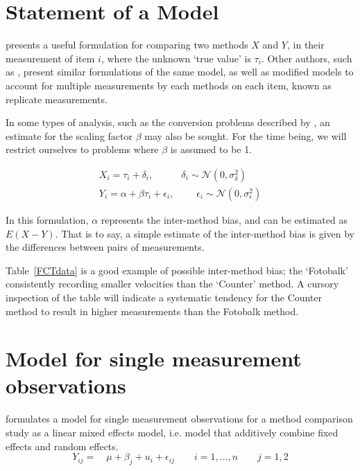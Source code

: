 \documentclass[12pt, a4paper]{report}
\theoremstyle{plain}
\theoremstyle{definition}
\theoremstyle{remark}
\begin{document}
	

	\section{Statement of a Model}
	\citet{BXC2010} presents a useful formulation for comparing two methods $X$ and $Y$, in their measurement of item $i$, where the unknown `true value' is $\tau_i$. Other authors, such as \citet{kinsella}, present similar formulations of the same model, as well as modified models to account for multiple measurements by each methods on each item, known as replicate measurements.
	
	In some types of analysis, such as the conversion problems described by \citet{lewis}, an estimate for 
	the scaling factor $\beta$ may also be sought. For the time being, we will restrict ourselves to problems where $\beta$ is assumed to be 1. 
	
	\begin{eqnarray}
	X_i = \tau_i + \delta_i , \phantom{spacin} \delta_i \sim \mathcal{N}(0,\sigma^2_\delta)\\
	Y_i = \alpha + \beta \tau_i + \epsilon_i, \phantom{spaci}  \epsilon_i \sim \mathcal{N}(0,\sigma^2_\epsilon)
	\end{eqnarray}
	
	In this formulation, $\alpha$ represents the inter-method bias, and can be estimated as $E(X-Y)$. That is to say, a simple estimate of the inter-method bias is given by the differences between pairs of measurements.  
	
	Table~\ref{FCTdata} is a good example of possible inter-method bias; the `Fotobalk' consistently recording
	smaller velocities than the `Counter' method. A cursory inspection of the table will indicate a systematic tendency for the Counter method to result in higher measurements than the Fotobalk method. %
	
	
\section{Model for single measurement observations}
\citet{Kinsella} formulates a model for
single measurement observations for a method comparison study as a
linear mixed effects model, i.e. model that additively combine
fixed effects and random effects.
\[
Y_{ij} =\quad \mu + \beta_{j} + u_{i} + \epsilon_{ij} \qquad i = 1,\dots,n
\qquad j=1,2\]
\end{document}
